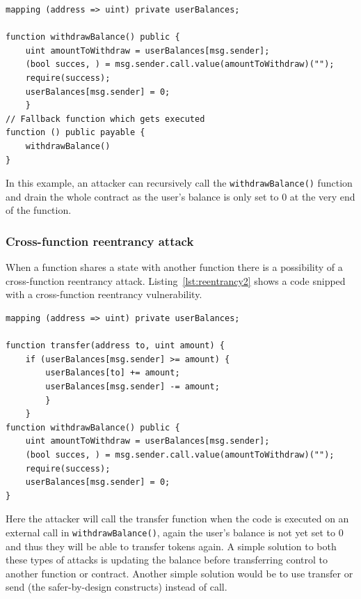\documentclass[10pt,conference]{IEEEtran}
\begin{document}
\begin{lstlisting}[language=Solidity, caption=Single function reentrancy attack, label=lst:reentrancy1]
mapping (address => uint) private userBalances;

function withdrawBalance() public {
    uint amountToWithdraw = userBalances[msg.sender];
    (bool succes, ) = msg.sender.call.value(amountToWithdraw)("");
    require(success);
    userBalances[msg.sender] = 0;
    }
// Fallback function which gets executed
function () public payable {
    withdrawBalance()
}
\end{lstlisting}

In this example,  an attacker can recursively call the \texttt{withdrawBalance()} function and drain the whole contract as the user's balance is only set to 0 at the very end of the function.

\subsubsection{Cross-function reentrancy attack}
When a function shares a state with another function there is a possibility of a cross-function reentrancy attack.  Listing~\ref{lst:reentrancy2}  shows a code snipped with a cross-function reentrancy vulnerability. 

\begin{lstlisting}[language=Solidity, caption=Cross-function reentrancy attack, label=lst:reentrancy2]
mapping (address => uint) private userBalances;

function transfer(address to, uint amount) {
    if (userBalances[msg.sender] >= amount) {
        userBalances[to] += amount;
        userBalances[msg.sender] -= amount;
        }
    }
function withdrawBalance() public {
    uint amountToWithdraw = userBalances[msg.sender];
    (bool succes, ) = msg.sender.call.value(amountToWithdraw)("");
    require(success);
    userBalances[msg.sender] = 0;
}

\end{lstlisting}

Here the attacker will call the transfer function when the code is executed on an external call in \texttt{withdrawBalance()},  again the user's balance is not yet set to 0 and thus they will be able to transfer tokens again. A simple solution to both these types of attacks is updating the balance before transferring control to another function or contract.  Another simple solution would be to use transfer or send (the safer-by-design constructs) instead of call.
\end{document}
